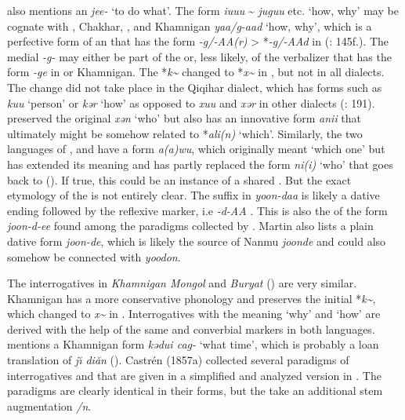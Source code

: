 \citet{Chaolu1996} also mentions an  \textit{jee-} ‘to do what’. The form \textit{iuuu} {\textasciitilde} \textit{juguu} etc. ‘how, why’ may be cognate with , Chakhar, , and Khamnigan \textit{yaa/g-aad} ‘how, why’, which is a perfective  form of an  that has the form \textit{-g/-AA(r)} > *\textit{-g/-AAd} in  (\citealt{Tsumagari2003}: 145f.). The medial \textit{-g-} may either be part of the  or, less likely, of the verbalizer that has the form \textit{-ge} in  or Khamnigan. The  *\textit{k{\textasciitilde}} changed to *\textit{x{\textasciitilde}} in , but not in all dialects. The change did not take place in the Qiqihar dialect, which has forms such as \textit{kuu} ‘person’ or \textit{kər} ‘how’ as opposed to \textit{xuu} and \textit{xər} in other dialects (\citealt{Ding1995}: 191).  preserved the original  \textit{xən} ‘who’ but also has an innovative form \textit{anii} that ultimately might be somehow related to *\textit{ali(n)} ‘which’. Similarly, the two   languages of ,  and  have a form \textit{a(a)wu}, which originally meant ‘which one’ but has extended its meaning and has partly replaced the form \textit{ni(i)} ‘who’ that goes back to  (). If true, this could be an instance of a shared . But the exact etymology of the   is not entirely clear. The suffix in \textit{yoon-daa} is likely a dative ending followed by the reflexive marker, i.e \textit{-d-AA} \citep[143]{Tsumagari2003}. This is also the  of the form \textit{joon-d-ee} found among the   paradigms collected by \citet[30]{Martin1961}. Martin also lists a plain dative form \textit{joon-de}, which is likely the source of Nanmu  \textit{joonde} and could also somehow be connected with  \textit{yoodon}.

The interrogatives in \textit{Khamnigan Mongol} and \textit{Buryat} () are very similar. Khamnigan has a more conservative phonology and preserves the initial *\textit{k{\textasciitilde}}, which changed to \textit{x{\textasciitilde}} in . Interrogatives with the meaning ‘why’ and ‘how’ are derived with the help of the same  and converbial markers in both languages. \citet{Yamakoshi2007a} mentions a Khamnigan form \textit{kədui cag-} ‘what time’, which is probably a loan translation of  \textit{j\u{\i} diăn} (). Castrén (1857a) collected several paradigms of interrogatives and  that are given in a simplified and analyzed version in . The paradigms are clearly identical in their  forms, but the  take an additional stem augmentation \textit{/n}.

